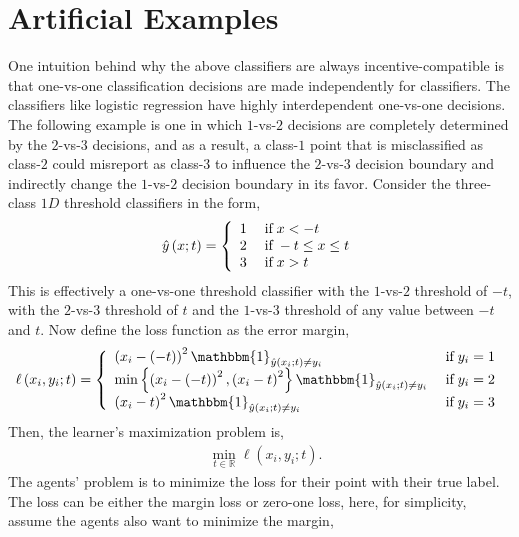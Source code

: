 \documentclass{article}
\begin{document}
\section{Artificial Examples} 
One intuition behind why the above classifiers are always incentive-compatible is that one-vs-one classification decisions are made independently for classifiers. The classifiers like logistic regression have highly interdependent one-vs-one decisions. The following example is one in which $1$-vs-$2$ decisions are completely determined by the $2$-vs-$3$ decisions, and as a result, a class-$1$ point that is misclassified as class-$2$ could misreport as class-$3$ to influence the $2$-vs-$3$ decision boundary and indirectly change the $1$-vs-$2$ decision boundary in its favor.
\newline \newline
Consider the three-class $1D$ threshold classifiers in the form,
\[ \hat{y}\left(x; t\right) =\left\{ \begin{array}{ll}
1& \text{\;if\;} x < -t \\
2& \text{\;if\;} -t \leq  x \leq  t \\
3& \text{\;if\;} x > t \\
\end{array}\right. \]
This is effectively a one-vs-one threshold classifier with the $1$-vs-$2$ threshold of $-t $, with the $2$-vs-$3$ threshold of $t $ and the $1$-vs-$3$ threshold of any value between $-t $ and $t $. Now define the loss function as the error margin,
\[ \ell\left(x_{i}, y_{i}; t\right) =\left\{ \begin{array}{ll}
\left(x_{i} - \left(-t\right)\right)^{2} \mathbbm{1}_{\hat{y}\left(x_{i}; t\right) \neq  y_{i}}& \text{\;if\;} y_{i} = 1 \\
\displaystyle\min\left\{\left(x_{i} - \left(-t\right)\right)^{2}, \left(x_{i} - t\right)^{2}\right\} \mathbbm{1}_{\hat{y}\left(x_{i}; t\right) \neq  y_{i}}& \text{\;if\;} y_{i} = 2 \\
\left(x_{i} - t\right)^{2} \mathbbm{1}_{\hat{y}\left(x_{i}; t\right) \neq  y_{i}}& \text{\;if\;} y_{i} = 3 \\
\end{array}\right. \]
Then, the learner's maximization problem is,
\begin{align*}
&\displaystyle\min_{t \in \mathbb{R}} \ell\left(x_{i}, y_{i}; t\right).
\end{align*}
The agents' problem is to minimize the loss for their point with their true label. The loss can be either the margin loss or zero-one loss, here, for simplicity, assume the agents also want to minimize the margin,
\end{document}
